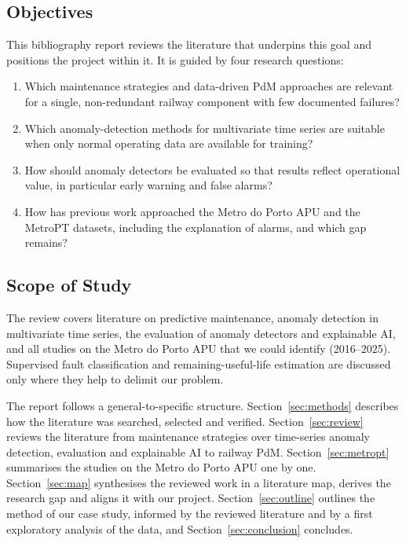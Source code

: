 \documentclass[12pt,a4paper]{article}
\begin{document}
\subsection{Objectives}
This bibliography report reviews the literature that underpins this goal and positions the project within it. It is guided by four research questions:
\begin{enumerate}[label=\textbf{RQ\arabic*}, leftmargin=*, itemsep=2pt]
  \item Which maintenance strategies and data-driven PdM approaches are relevant for a single, non-redundant railway component with few documented failures?
  \item Which anomaly-detection methods for multivariate time series are suitable when only normal operating data are available for training?
  \item How should anomaly detectors be evaluated so that results reflect operational value, in particular early warning and false alarms?
  \item How has previous work approached the Metro do Porto APU and the MetroPT datasets, including the explanation of alarms, and which gap remains?
\end{enumerate}

\subsection{Scope of Study}
The review covers literature on predictive maintenance, anomaly detection in multivariate time series, the evaluation of anomaly detectors and explainable AI, and all studies on the Metro do Porto APU that we could identify (2016--2025). Supervised fault classification and remaining-useful-life estimation are discussed only where they help to delimit our problem.

The report follows a general-to-specific structure. Section~\ref{sec:methods} describes how the literature was searched, selected and verified. Section~\ref{sec:review} reviews the literature from maintenance strategies over time-series anomaly detection, evaluation and explainable AI to railway PdM. Section~\ref{sec:metropt} summarises the studies on the Metro do Porto APU one by one. Section~\ref{sec:map} synthesises the reviewed work in a literature map, derives the research gap and aligns it with our project. Section~\ref{sec:outline} outlines the method of our case study, informed by the reviewed literature and by a first exploratory analysis of the data, and Section~\ref{sec:conclusion} concludes.
\end{document}
